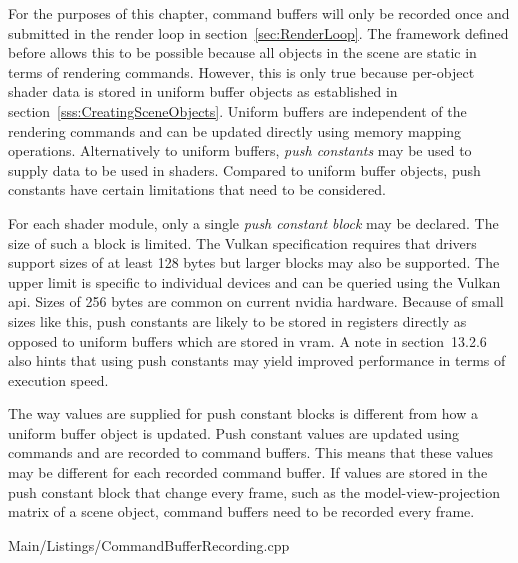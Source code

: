     For the purposes of this chapter, command buffers will only be recorded once and submitted in the render loop in section~\ref{sec:RenderLoop}.
    The framework defined before allows this to be possible because all objects in the scene are static in terms of rendering commands.
    However, this is only true because per-object shader data is stored in uniform buffer objects as established in section~\ref{sss:CreatingSceneObjects}.
    Uniform buffers are independent of the rendering commands and can be updated directly using memory mapping operations.
    Alternatively to uniform buffers, \textit{push constants} may be used to supply data to be used in shaders.
    Compared to uniform buffer objects, push constants have certain limitations that need to be considered.

    For each shader module, only a single \textit{push constant block} may be declared.
    The size of such a block is limited.
    The Vulkan specification requires that \glspl{driver} support sizes of at least 128 bytes but larger blocks may also be supported.
    The upper limit is specific to individual devices and can be queried using the Vulkan \gls{api}.
    Sizes of 256 bytes are common on current \gls{nvidia} hardware.
    Because of small sizes like this, push constants are likely to be stored in registers directly as opposed to uniform buffers which are stored in \gls{vram}.
    A note in section~13.2.6 also hints that using push constants may yield improved performance in terms of execution speed.

    The way values are supplied for push constant blocks is different from how a uniform buffer object is updated.
    Push constant values are updated using commands and are recorded to command buffers.
    This means that these values may be different for each recorded command buffer.
    If values are stored in the push constant block that change every frame, such as the model-view-projection matrix of a scene object, command buffers need to be recorded every frame.


      
      {Main/Listings/CommandBufferRecording.cpp}

